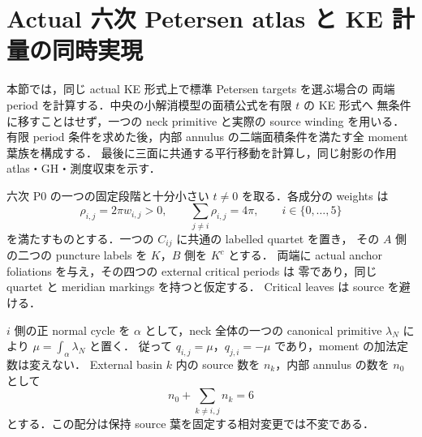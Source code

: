 \section{Actual 六次 Petersen atlas と KE 計量の同時実現}
\label{ke:petersen-compatibility-section}

本節では，同じ actual KE 形式上で標準 Petersen targets を選ぶ場合の
両端 period を計算する．中央の小解消模型の面積公式を有限 $t$ の KE 形式へ
無条件に移すことはせず，一つの neck primitive と実際の source winding を用いる．
有限 period 条件を求めた後，内部 annulus の二端面積条件を満たす全 moment 葉族を構成する．
最後に三面に共通する平行移動を計算し，同じ射影の作用 atlas・GH・測度収束を示す．

\begin{proposition}
\label{ke:petersen-actual-neck-periods}
六次 P0 の一つの固定段階と十分小さい $t\ne0$ を取る．各成分の weights は
\[
 \rho_{i,j}=2\pi w_{i,j}>0,\qquad
 \sum_{j\ne i}\rho_{i,j}=4\pi,
 \qquad i\in\{0,\ldots,5\}
\]
を満たすものとする．一つの $C_{ij}$ に共通の labelled quartet を置き，
その $A$ 側の二つの puncture labels を $K$，$B$ 側を $K^c$ とする．
両端に actual anchor foliations を与え，その四つの external critical periods は
零であり，同じ quartet と meridian markings を持つと仮定する．
Critical leaves は source を避ける．

$i$ 側の正 normal cycle を $\alpha$ として，neck 全体の一つの canonical primitive
$\lambda_N$ により $\mu=\int_\alpha\lambda_N$ と置く．
従って $q_{i,j}=\mu$，$q_{j,i}=-\mu$ であり，moment の加法定数は変えない．
External basin $k$ 内の source 数を $n_k$，内部 annulus の数を $n_0$ として
\[
 n_0+\sum_{k\ne i,j}n_k=6
\]
とする．この配分は保持 source 葉を固定する相対変更では不変である．


\end{proposition}
